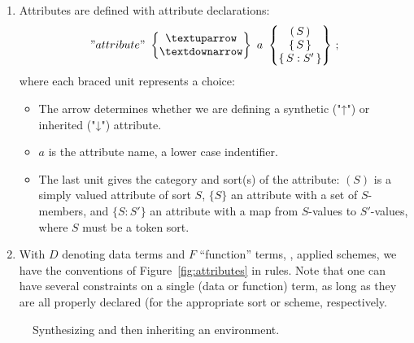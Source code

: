 \documentclass[11pt]{article} %
\begin{document}
\begin{notation}[attributes]\leavevmode
  \begin{enumerate}

  \item Attributes are defined with attribute declarations:
    \begin{displaymath}
      "attribute"
      ~
      \left\{
      \begin{matrix}
        {↑} \\
        {↓}
      \end{matrix}
      \right\}
      ~
      a
      ~
      \left\{
      \begin{matrix}
        (\,S\,) \\
        \{\,S\,\} \\
        \{\,S : S'\,\}
      \end{matrix}
      \right\}
      \,;
    \end{displaymath}
    where each braced unit represents a choice:
    \begin{itemize}
    \item The arrow determines whether we are defining a synthetic ("↑") or inherited ("↓")
      attribute.
    \item $a$ is the attribute name, a lower case indentifier.
    \item The last unit gives the category and sort(s) of the attribute: $(S)$ is a simply valued
      attribute of sort $S$, $\{S\}$ an attribute with a set of $S$-members, and $\{S:S'\}$ an
      attribute with a map from $S$-values to $S'$-values, where $S$ must be a token sort.
    \end{itemize}

  \item With $D$ denoting data terms and $F$ ``function'' terms, \ie, applied schemes, we have the
    conventions of Figure~\ref{fig:attributes} in \HAX rules.  Note that one can have several
    constraints on a single (data or function) term, as long as they are all properly declared (for
    the appropriate sort or scheme, respectively.

  \end{enumerate}
\end{notation}

\begin{figure}[t!]
  \caption{Synthesizing and then inheriting an environment.}
  \label{fig:letrec}
\end{figure}
\end{document}
